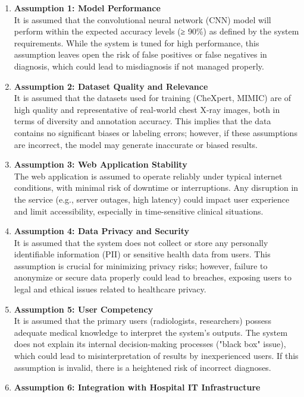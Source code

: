 \documentclass{article}
\begin{document}
\begin{enumerate}
  \item \textbf{Assumption 1: Model Performance} \\
    It is assumed that the convolutional neural network (CNN) model will perform within the
    expected accuracy levels (≥ 90\%) as defined by the system requirements. While the system is
    tuned for high performance, this assumption leaves open the risk of false positives or false
    negatives in diagnosis, which could lead to misdiagnosis if not managed properly.
  \item \textbf{Assumption 2: Dataset Quality and Relevance} \\
    It is assumed that the datasets used for training (CheXpert, MIMIC) are of high quality and
    representative of real-world chest X-ray images, both in terms of diversity and annotation
    accuracy. This implies that the data contains no significant biases or labeling errors;
    however, if these assumptions are incorrect, the model may generate inaccurate or biased
    results.
  \item \textbf{Assumption 3: Web Application Stability} \\
    The web application is assumed to operate reliably under typical internet conditions, with
    minimal risk of downtime or interruptions. Any disruption in the service (e.g., server
    outages, high latency) could impact user experience and limit accessibility, especially in
    time-sensitive clinical situations.
  \item \textbf{Assumption 4: Data Privacy and Security} \\
    It is assumed that the system does not collect or store any personally identifiable
    information (PII) or sensitive health data from users. This assumption is crucial for
    minimizing privacy risks; however, failure to anonymize or secure data properly could lead to
    breaches, exposing users to legal and ethical issues related to healthcare privacy.
  \item \textbf{Assumption 5: User Competency} \\
    It is assumed that the primary users (radiologists, researchers) possess adequate medical
    knowledge to interpret the system’s outputs. The system does not explain its internal
    decision-making processes ("black box" issue), which could lead to misinterpretation of
    results by inexperienced users. If this assumption is invalid, there is a heightened risk of
    incorrect diagnoses.
  \item \textbf{Assumption 6: Integration with Hospital IT Infrastructure} \\

\end{enumerate}
\end{document}
